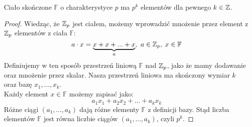 

\begin{theorem}
Ciało skończone \( \mathbb{F} \)  o charakterystyce \( p \) ma \( p^k \) elementów dla pewnego \( k \in \mathbb{Z} \).
\end{theorem}
 \begin{proof}
    Wiedząc, że \( \mathbb{Z}_p \) jest ciałem, możemy wprowadzić mnożenie przez element z \( \mathbb{Z}_p \) elementów z ciała \( \mathbb{F} \):
    \[
        a \cdot x = \underbrace{x + x + ... + x}_a, \ a \in \mathbb{Z}_p,\; x \in \mathbb{F}
    \]
    Definiujemy w ten sposób przestrzeń liniową \( \mathbb{F} \) nad \( \mathbb{Z}_p \), jako że mamy dodawanie oraz mnożenie przez skalar. Nasza przestrzeń liniowa ma skończony wymiar \( k \) oraz bazę \( x_1, \dots, x_k \). \\
    Każdy element \( x \in \mathbb{F} \) możemy zapisać jako:
    \[
        a_1x_1 + a_2x_2 + \dots + a_kx_k
    \]
    Różne ciągi \( (a_1, \dots, a_k) \) dają różne elementy \( \mathbb{F} \) z definicji bazy. Stąd liczba elementów \( \mathbb{F} \) jest równa liczbie ciągów \( (a_1, \dots, a_k) \), czyli \( p^k \).
\end{proof}